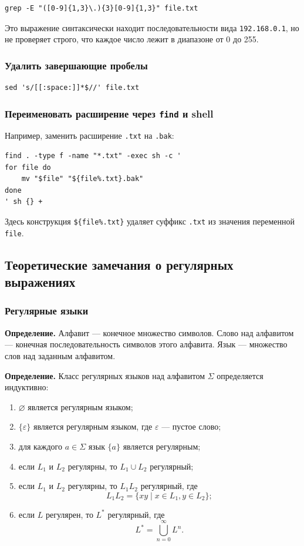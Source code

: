 \documentclass[12pt,a4paper]{article}
\begin{document}
\begin{verbatim}
grep -E "([0-9]{1,3}\.){3}[0-9]{1,3}" file.txt
\end{verbatim}

Это выражение синтаксически находит последовательности вида \texttt{192.168.0.1}, но не проверяет строго, что каждое число лежит в диапазоне от 0 до 255.

\subsubsection{Удалить завершающие пробелы}

\begin{verbatim}
sed 's/[[:space:]]*$//' file.txt
\end{verbatim}

\subsubsection{Переименовать расширение через \texttt{find} и shell}

Например, заменить расширение \texttt{.txt} на \texttt{.bak}:

\begin{verbatim}
find . -type f -name "*.txt" -exec sh -c '
for file do
    mv "$file" "${file%.txt}.bak"
done
' sh {} +
\end{verbatim}

Здесь конструкция \texttt{\$\{file\%.txt\}} удаляет суффикс \texttt{.txt} из значения переменной \texttt{file}.

\subsection{Теоретические замечания о регулярных выражениях}

\subsubsection{Регулярные языки}

\textbf{Определение.}
Алфавит --- конечное множество символов. Слово над алфавитом --- конечная последовательность символов этого алфавита. Язык --- множество слов над заданным алфавитом.

\textbf{Определение.}
Класс регулярных языков над алфавитом $\Sigma$ определяется индуктивно:

\begin{enumerate}
    \item $\varnothing$ является регулярным языком;
    \item $\{\varepsilon\}$ является регулярным языком, где $\varepsilon$ --- пустое слово;
    \item для каждого $a \in \Sigma$ язык $\{a\}$ является регулярным;
    \item если $L_1$ и $L_2$ регулярны, то $L_1 \cup L_2$ регулярный;
    \item если $L_1$ и $L_2$ регулярны, то $L_1 L_2$ регулярный, где
    \[
        L_1 L_2 = \{xy \mid x \in L_1, y \in L_2\};
    \]
    \item если $L$ регулярен, то $L^*$ регулярный, где
    \[
        L^* = \bigcup_{n=0}^{\infty} L^n.
    \]
\end{enumerate}
\end{document}
